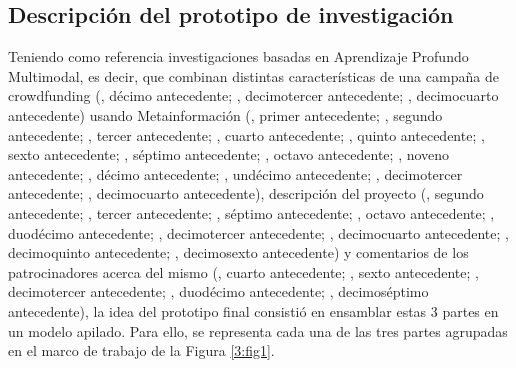 \subsection{Descripción del prototipo de investigación}
Teniendo como referencia investigaciones basadas en Aprendizaje Profundo Multimodal, es decir, que combinan distintas características de una campaña de crowdfunding (\citeauthor{pr_kamath2018suplearn}, décimo antecedente; \citeauthor{pr_jin2019dayssuccess}, decimotercer antecedente; \citeauthor{pr_cheng2019deeplearning}, decimocuarto antecedente) usando Metainformación (\citeauthor{pr_chen2013kickpredict}, primer antecedente; \citeauthor{pr_mitra2014phrases}, segundo antecedente; \citeauthor{pr_zhou2015projectdesc}, tercer antecedente; \citeauthor{pr_chen2015predcrowd}, cuarto antecedente; \citeauthor{pr_beckwith2016predcrowd}, quinto antecedente; \citeauthor{pr_li2016predcrowd}, sexto antecedente; \citeauthor{pr_yuan2016textanalytics}, séptimo antecedente; \citeauthor{pr_sawhney2016usingLT}, octavo antecedente; \citeauthor{pr_kaur2017socmedcrowd}, noveno antecedente; \citeauthor{pr_kamath2018suplearn}, décimo antecedente; \citeauthor{pr_yu2018deeplearning}, undécimo antecedente; \citeauthor{pr_jin2019dayssuccess}, decimotercer antecedente; \citeauthor{pr_cheng2019deeplearning}, decimocuarto antecedente), descripción del proyecto (\citeauthor{pr_mitra2014phrases}, segundo antecedente; \citeauthor{pr_zhou2015projectdesc}, tercer antecedente; \citeauthor{pr_yuan2016textanalytics}, séptimo antecedente; \citeauthor{pr_sawhney2016usingLT}, octavo antecedente; \citeauthor{pr_lee2018contentDL}, duodécimo antecedente; \citeauthor{pr_jin2019dayssuccess}, decimotercer antecedente; \citeauthor{pr_cheng2019deeplearning}, decimocuarto antecedente; \citeauthor{pr_chen2019keywords_crowdfunding}, decimoquinto antecedente; \citeauthor{pr_chaichi2019nlp_3dprinting}, decimosexto antecedente) y comentarios de los patrocinadores acerca del mismo (\citeauthor{pr_chen2015predcrowd}, cuarto antecedente; \citeauthor{pr_li2016predcrowd}, sexto antecedente; \citeauthor{pr_jin2019dayssuccess}, decimotercer antecedente; \citeauthor{pr_lee2018contentDL}, duodécimo antecedente; \citeauthor{pr_shafqat2019topicpredictions}, decimoséptimo antecedente), la idea del prototipo final consistió en ensamblar estas 3 partes en un modelo apilado. Para ello, se representa cada una de las tres partes agrupadas en el marco de trabajo de la Figura \ref{3:fig1}.
